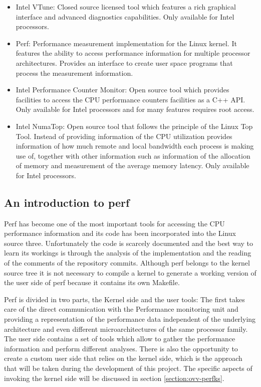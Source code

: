 \begin{itemize}
	\item Intel VTune: Closed source licensed tool which features a rich graphical interface and advanced diagnostics capabilities. Only available for Intel processors.
\item Perf: Performance measurement implementation for the Linux kernel. It features the ability to access performance information for multiple processor architectures. Provides an interface to create user space programs that process the measurement information.
\item Intel Performance Counter Monitor: Open source tool which provides facilities to access the CPU performance counters facilities as a C++ API. Only available for Intel processors and for many features requires root access.
\item Intel NumaTop: Open source tool that follows the principle of the Linux Top Tool. Instead of providing information of the CPU utilization provides information of how much remote and local bandwidth each process is making use of, together with other information such as information of the allocation of memory and measurement of the average memory latency. Only available for Intel processors. 
\end{itemize}

\subsection{An introduction to perf }\label{subsection:intro-perf}

Perf has become one of the most important tools for accessing the CPU performance information and its code has been incorporated into the Linux source three. Unfortunately the code is scarcely documented and the best way to learn its workings is through the analysis of the implementation and the reading of the comments of the repository commits. Although perf belongs to the kernel source tree it is not necessary to compile a kernel to generate a working version of the user side of perf because it contains its own Makefile.

Perf is divided in two parts, the Kernel side and the user tools: The first takes care of the direct communication with the Performance monitoring unit and providing a representation of the performance data independent of the underlying architecture and even different microarchitectures of the same processor family. The user side contains a set of tools which allow to gather the performance information and perform different analyses. There is also the opportunity to create a custom user side that relies on the kernel side, which is the approach that will be taken during the development of this project. The specific aspects of invoking the kernel side will be discussed in section \ref{section:ovv-perfks}.

